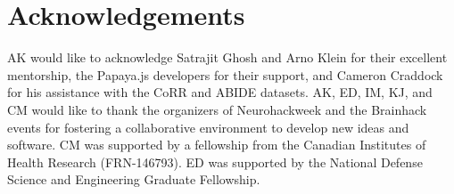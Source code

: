 \section{Acknowledgements}
AK would like to acknowledge Satrajit Ghosh and Arno Klein for their excellent mentorship, the Papaya.js developers for their support, and Cameron Craddock for his assistance with the CoRR and ABIDE datasets. AK, ED, IM, KJ, and CM would like to thank the organizers of Neurohackweek and the Brainhack events for fostering a collaborative environment to develop new ideas and software. CM was supported by a fellowship from the Canadian Institutes of Health Research (FRN-146793).  ED was supported by the National Defense Science and Engineering Graduate Fellowship. 

